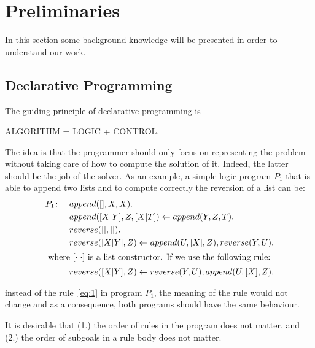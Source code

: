 \section{Preliminaries}
\label{sec:prelim}

In this section some background knowledge will be presented in order to understand our work. 

\subsection{Declarative Programming}
The guiding principle of declarative programming is
\begin{center} 
  ALGORITHM = LOGIC + CONTROL.
\end{center}
The idea is that the programmer should only focus on representing the problem without taking care of how to compute the solution of it. Indeed, the latter should be the job of the solver. As an example, a simple logic program \(P_1\) that  is able to append two lists and to compute correctly the reversion of a list can be: 
\begin{align}
P_1 \colon \quad%
&append ([], X, X). \\
&append ([X|Y], Z, [X|T ]) \leftarrow append (Y, Z, T ). \\
&reverse([ ], [ ]).\\
&reverse([X|Y ], Z) \leftarrow append (U, [X], Z), reverse(Y, U ). \label{eq:1} \\
\intertext{
where \([\cdot|\cdot]\) is a list constructor.
If we use the following rule:}
&reverse([X|Y ], Z) \leftarrow reverse(Y, U ), append(U, [X], Z). \label{eq:2}
\end{align}

\noindent instead of the rule~\eqref{eq:1} in program \(P_1\), the meaning of the rule would not change and as a consequence, both programs should have the same behaviour. 

It is desirable that (1.) the order of rules in the program does not matter, and (2.) the order of subgoals in a rule body does not matter.

